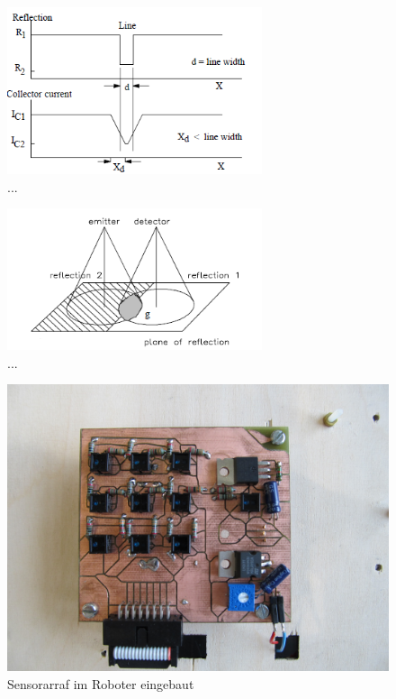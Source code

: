 \documentclass[a4paper,bibtotoc,oneside]{scrbook}
\begin{document}
\begin{figure}[htbp]
\centering
\includegraphics[width=75mm]{img/cny70.png}
\caption[...]{...}\label{cny1}
\end{figure}

\begin{figure}[htbp]
\centering
\includegraphics[width=75mm]{img/cny701.png}
\caption[...]{...}\label{cny2}
\end{figure}

\begin{figure}[htbp]
\centering
\includegraphics[width=125mm]{img/sensor_array.jpg}
\caption[Sensorarray]{Sensorarraf im Roboter eingebaut}\label{array3}
\end{figure}
\end{document}

